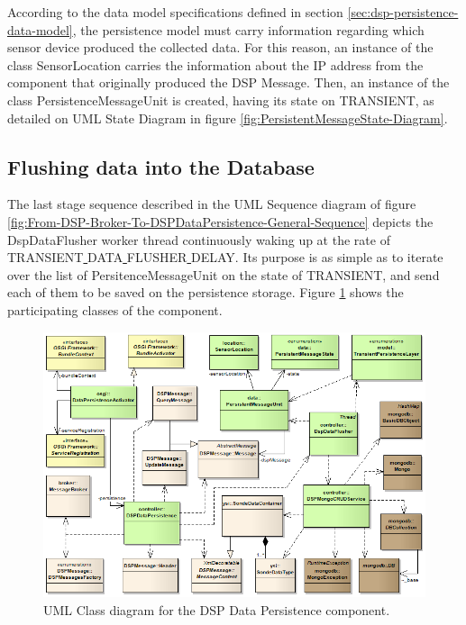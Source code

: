 According to the data model specifications defined in section
\ref{sec:dsp-persistence-data-model}, the persistence model must carry
information regarding which sensor device produced the collected data. For
this reason, an instance of the class SensorLocation carries the information
about the IP address from the component that originally produced the DSP
Message. Then, an instance of the class PersistenceMessageUnit is created,
having its state on TRANSIENT, as detailed on UML State Diagram \cite{uml} in
figure \ref{fig:PersistentMessageState-Diagram}.

\subsection{Flushing data into the Database}

The last stage sequence described in the UML Sequence diagram of figure
\ref{fig:From-DSP-Broker-To-DSPDataPersistence-General-Sequence} depicts the
DspDataFlusher worker thread continuously waking up at the rate of
TRANSIENT\underline{ }DATA\underline{ }FLUSHER\underline{ }DELAY. Its purpose
is as simple as to iterate over the list of PersitenceMessageUnit on the state
of TRANSIENT, and send each of them to be saved on the persistence storage.
Figure \ref{fig:DSP-Data-Persistence-Classes} shows the participating classes
of the component.

\begin{figure}[!b]
  \centering
  \includegraphics[scale=0.5]{../diagrams/DSP-Data-Persistence-Classes}
  \caption{UML Class diagram for the DSP Data Persistence component.}
  \label{fig:DSP-Data-Persistence-Classes}
\end{figure}

